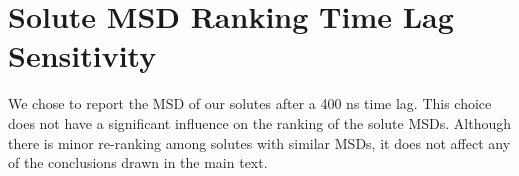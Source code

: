 \documentclass{article}
\begin{document}
%  
%  
%  
%  

  \section{Solute MSD Ranking Time Lag Sensitivity}\label{section:lag_sensitivity}
  
  We chose to report the MSD of our solutes after a 400 ns time lag. This choice does
  not have a significant influence on the ranking of the solute MSDs. Although there
  is minor re-ranking among solutes with similar MSDs, it does not affect any of 
  the conclusions drawn in the main text.
  
\end{document}
